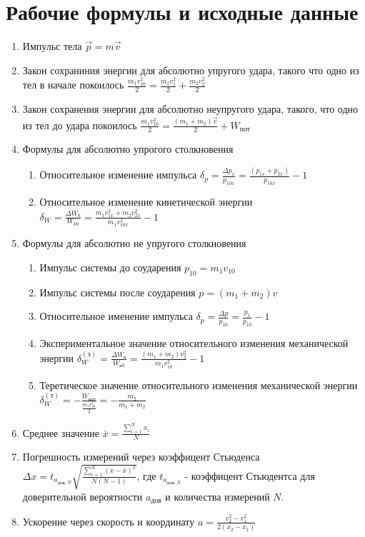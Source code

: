 \documentclass[20pt]{article}
\begin{document}
\section{Рабочие формулы и исходные данные}
\begin{enumerate}
    \item Импульс тела $\overrightarrow{p} = m\overrightarrow{v}$
    \item Закон сохраниния энергии для абсолютно упругого удара, такого что одно из тел в начале покоилось  $\frac{m_1 v_{10}^2}{2} = \frac{m_2 v_{1}^2}{2} + \frac{m_2 v_{2}^2}{2}$
    \item Закон сохранения энергии для абсолютно неупругого удара, такого, что одно из тел до удара покоилось $\frac{m_1 v_{10}^2}{2} = \frac{(m_1 + m_2)\overrightarrow{v}}{2} + W_{пот}$
    \item $\textbf{Формулы для абсолютно упрогого столкновения}$
    \begin{enumerate}
         \item Относительное изменение импульса $\delta_p = \frac{\Delta p_x}{p_{10x}} = \frac{(p_{1x} + p_{2x})}{p_{10x}} - 1$
        \item Относительное изменение кинетической энергии $\delta_W = \frac{\Delta W_k}{W_{k0}} = \frac{m_1 v_{1x}^2 + m_2 v_{2x}^2}{m_1 v_{10x}^2} - 1$
    \end{enumerate}
    \item $\textbf{Формулы для абсолютно не упругого столкновения}$
    \begin{enumerate}
        \item Импульс системы до соударения $p_{10} = m_1 v_{10}$\\
        \item Импульс системы после соударения $p =(m_1 + m_2) v$\\
        \item Относительное именение импульса $\delta_p = \frac{\Delta p}{p_{10}} =  \frac{p_1}{p_{10}} - 1$\\
        \item Экспериментальное значение относительного изменения механической энергии $\delta^{(э)}_W = \frac{\Delta W_к}{W_{к0}} = \frac{(m_1 + m_2) v_2^2}{m_1 v_{10}^2} - 1$\\
        \item Теретическое значение относительного изменения механической энергии $\delta^{(т)}_W = -\frac{W_{пот}}{\frac{m_1 v^2_{10}}{2}} = -\frac{m_2}{m_1 + m_2}$
    \end{enumerate}
    \item Среднее значение $\bar{x} = \frac{\sum\limits_{i=1}^N x_i}{N}$
    \item Погрешность измерений через коэффицент Стьюденса $\Delta x = t_{a_{дов, N}}\sqrt{\frac{\sum\limits_{i=1}^N (x - \bar{x})^2}{N (N-1)}}$, где $t_{a_{дов, N}}$ - коэффицент Стьюдентса для доверительной вероятности $a_{дов}$ и количества измерений $N$.
    \item Ускорение через скорость и координату $a = \frac{v^2_2 -v^2_1}{2(x_2 - x_1)}$
\end{enumerate}
\end{document}
